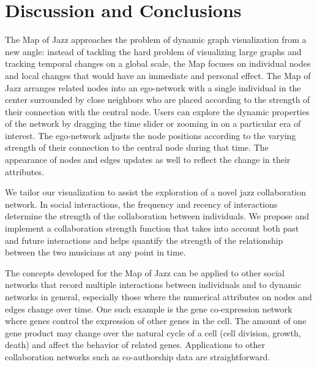 \documentclass[12pt]{cmuthesis}
\begin{document}
\section{Discussion and Conclusions}

  The Map of Jazz approaches the problem of dynamic graph visualization from a new angle: instead of tackling the hard problem of visualizing large graphs and tracking temporal changes on a global scale, the Map focuses on individual nodes and local changes that would have an immediate and personal effect. The Map of Jazz arranges related nodes into an ego-network with a single individual in the center surrounded by close neighbors who are placed according to the strength of their connection with the central node. Users can explore the dynamic properties of the network by dragging the time slider or zooming in on a particular era of interest. The ego-network adjusts the node positions according to the varying strength of their connection to the central node during that time. The appearance of nodes and edges updates as well to reflect the change in their attributes.

  We tailor our visualization to assist the exploration of a novel jazz collaboration network. In social interactions, the frequency and recency of interactions determine the strength of the collaboration between individuals. We propose and implement a collaboration strength function that takes into account both past and future interactions and helps quantify the strength of the relationship between the two musicians at any point in time.

  The concepts developed for the Map of Jazz can be applied to other social networks that record multiple interactions between individuals and to dynamic networks in general, especially those where the numerical attributes on nodes and edges change over time. One such example is the gene co-expression network where genes control the expression of other genes in the cell. The amount of one gene product may change over the natural cycle of a cell (cell division, growth, death) and affect the behavior of related genes. Applications to other collaboration networks such as co-authorship data are straightforward.





\end{document}
